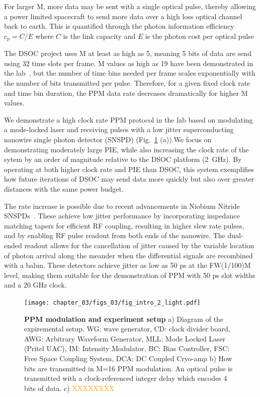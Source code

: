 \documentclass[11pt]{caltech_thesis} %
\begin{document}
For larger M, more data may be sent with a single optical pulse, thereby
allowing a power limited spacecraft to send more data over a high loss
optical channel back to earth. This is quantified through the photon
information efficiency $c_p = C/E$ where $C$ is the link capacity and
$E$ is the photon cost per optical pulse

The DSOC project uses M at least as high as 5, meaning 5 bits of data
are send using 32 time slots per frame. M values as high as 19 have been
demonstrated in the lab~\autocite{essiambre2023record},
but the number of time bins needed per frame scales exponentially with
the number of bits transmitted per pulse. Therefore, for a given fixed
clock rate and time bin duration, the PPM data rate decreases
dramatically for higher M values.

We demonstrate a high clock rate PPM protocol in the lab based on
modulating a mode-locked laser and receiving pulses with a low jitter
superconducting nanowire single photon detector (SNSPD)
(Fig.~\ref{fig:intro} (a)).We focus on demonstrating moderately large
PIE, while also increasing the clock rate of the sytem by an order of
magnitude relative to the DSOC platform (2~GHz). By
operating at both higher clock rate and PIE than DSOC, this system
exemplifies how future iterations of DSOC may send data more quickly but
also over greater distances with the same power budget.

The rate increase is possible due to recent advancements in Niobium
Nitride SNSPDs~\autocite{Colangelo2023}. These achieve
low jitter performance by incorporating impedance matching tapers for
efficient RF coupling, resulting in higher slew rate pulses, and by
enabling RF pulse readout from both ends of the nanowire. The dual-ended
readout allows for the cancellation of jitter caused by the variable
location of photon arrival along the meander when the differential
signals are recombined with a balun. These detectors achieve jitter as
low as 50 ps at the FW(1/100)M level, making them suitable for the
demonstration of PPM with 50 ps slot widths and a 20 GHz clock.

\hypertarget{fig:intro}{%
\begin{figure}
\centering
\texttt{[image: chapter\_03/figs\_03/fig\_intro\_2\_light.pdf]}
\caption[{PPM modulation and experiment setup}]{\textbf{PPM modulation
and experiment setup} a) Diagram of the expiremental setup. WG: wave
generator, CD: clock divider board, AWG: Arbitrary Waveform Generator,
MLL: Mode Locked Laser (Pritel UAC), IM: Intensity Modulator, BC: Bias
Controller, FSC: Free Space Coupling System, DCA: DC Coupled Cryo-amp b)
How bits are transmitted in M=16 PPM modulation. An optical pulse is
transmitted with a clock-referenced integer delay which encodes 4 bits
of data. c) \textcolor{orange}{XXXXXXXX}}
\label{fig:intro}
\end{figure}
}
\end{document}
